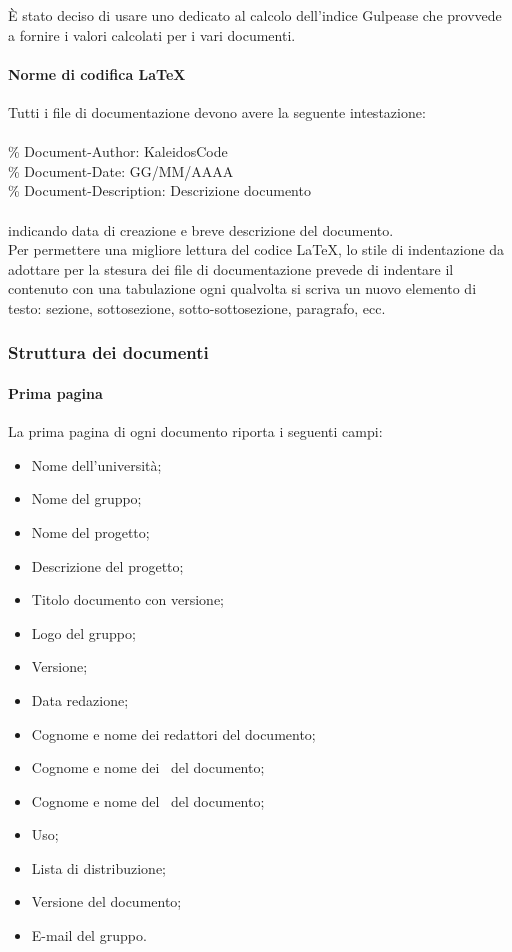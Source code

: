 \documentclass[../NormeDiProgetto.tex]{subfiles}
\begin{document}
							È stato deciso di usare uno  dedicato al calcolo dell'indice Gulpease che provvede a fornire i valori calcolati per i vari documenti.

				\paragraph{Norme di codifica \LaTeX \\}
					Tutti i file di documentazione devono avere la seguente intestazione:\\
					\\
					\% Document-Author: KaleidosCode\\
					\% Document-Date: GG/MM/AAAA\\
					\% Document-Description: Descrizione documento\\
					\\
					indicando data di creazione e breve descrizione del documento.\\
					Per permettere una migliore lettura del codice \LaTeX, lo stile di indentazione da
					adottare per la stesura dei file di documentazione prevede di indentare il contenuto
					con una tabulazione ogni qualvolta si scriva un nuovo elemento di testo: sezione,
					sottosezione, sotto-sottosezione, paragrafo, ecc.\\
			\subsubsection{Struttura dei documenti}
				\paragraph{Prima pagina\\}
					La prima pagina di ogni documento riporta i seguenti campi:
					\begin{itemize}
						\item Nome dell'università;
						\item Nome del gruppo;
						\item Nome del progetto;
						\item Descrizione del progetto;
						\item Titolo documento con versione;
						\item Logo del gruppo;
						\item Versione;
						\item Data redazione;
						\item Cognome e nome dei redattori del documento;
						\item Cognome e nome dei \verificatori\ del documento;
						\item Cognome e nome del \responsabilediprogetto\ del documento;
						\item Uso;
						\item Lista di distribuzione;
						\item Versione del documento;
						\item E-mail del gruppo.
					\end{itemize} 
\end{document}
